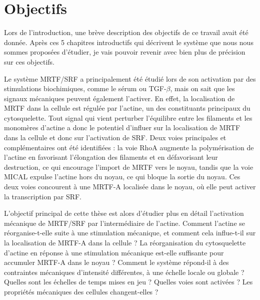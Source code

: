 %
%
\chapter*{Objectifs}

Lors de l'introduction, une brève description des objectifs de ce travail avait été donnée. Après ces 5 chapitres introductifs qui décrivent le système que nous nous sommes proposées d'étudier, je vais pouvoir revenir avec bien plus de précision sur ces objectifs. 

Le système MRTF/SRF a principalement été étudié lors de son activation par des stimulations biochimiques, comme le sérum ou TGF-$\beta$, mais on sait que les signaux mécaniques peuvent également l'activer. 
En effet, la localisation de MRTF dans la cellule est régulée par l'actine, un des constituants principaux du cytosquelette. 
Tout signal qui vient perturber l'équilibre entre les filaments et les monomères d'actine a donc le potentiel d'influer sur la localisation de MRTF dans la cellule et donc sur l'activation de SRF. 
Deux voies principales et complémentaires ont été identifiées : la voie RhoA augmente la polymérisation de l'actine en favorisant l'élongation des filaments et en défavorisant leur destruction, ce qui encourage l'import de MRTF vers le noyau, tandis que la voie MICAL expulse l'actine hors du noyau, ce qui bloque la sortie du noyau. Ces deux voies concourent à une MRTF-A localisée dans le noyau, où elle peut activer la transcription par SRF. 

L'objectif principal de cette thèse est alors d'étudier plus en détail l'activation mécanique de MRTF/SRF par l'intermédiaire de l'actine. Comment l'actine se réorganise-t-elle suite à une stimulation mécanique, et comment cela influe-t-il sur la localisation de MRTF-A dans la cellule ? La réorganisation du cytosquelette d'actine en réponse à une stimulation mécanique est-elle suffisante pour accumuler MRTF-A dans le noyau ? Comment le système répond-il à des contraintes mécaniques d'intensité différentes, à une échelle locale ou globale ? Quelles sont les échelles de temps mises en jeu ? Quelles voies sont activées ? Les propriétés mécaniques des cellules changent-elles ? 

